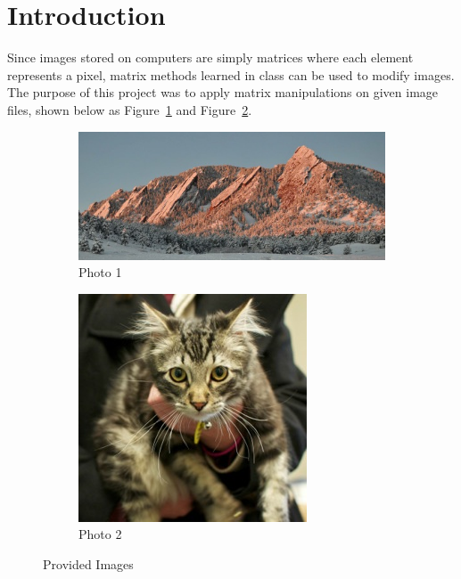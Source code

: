 \section*{Introduction}
Since images stored on computers are simply matrices where each element
represents a pixel, matrix methods learned in class can be used to
modify images. The purpose of this project was to apply matrix manipulations
on given image files, shown below as Figure~\ref{fig:p1} and
Figure~\ref{fig:p2}.

\begin{figure}[ht]
  \centering
  \begin{subfigure}{0.6\textwidth}
    \centering
    \includegraphics[scale=0.5]{./img/photo1.png}
    \caption{Photo 1}
    \label{fig:p1}
  \end{subfigure}
  \begin{subfigure}{0.3\textwidth}
    \centering
    \includegraphics[scale=0.5]{./img/photo2.png}
    \caption{Photo
    2}
    \label{fig:p2}
  \end{subfigure}
  \caption{Provided
  Images}
  \label{fig:init_image}
\end{figure}

